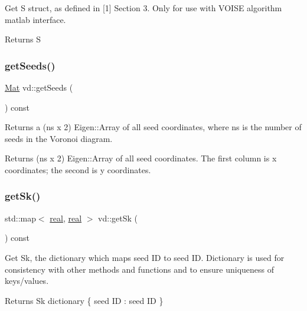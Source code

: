Get S struct, as defined in \mbox{[}1\mbox{]} Section 3. Only for use with V\+O\+I\+SE algorithm matlab interface. \begin{DoxyReturn}{Returns}
S 
\end{DoxyReturn}
\mbox{\label{classvd_a82f353c594c3c6b24f6077398f059d3a}} 
\subsubsection{\texorpdfstring{get\+Seeds()}{getSeeds()}}
{\footnotesize\ttfamily \mbox{\hyperlink{typedefs_8cpp_a9fa28c1f74e909474857584f5c7b0088}{Mat}} vd\+::get\+Seeds (\begin{DoxyParamCaption}{ }\end{DoxyParamCaption}) const}

Returns a (ns x 2) Eigen\+::\+Array of all seed coordinates, where ns is the number of seeds in the Voronoi diagram. \begin{DoxyReturn}{Returns}
(ns x 2) Eigen\+::\+Array of all seed coordinates. The first column is x coordinates; the second is y coordinates. 
\end{DoxyReturn}
\mbox{\label{classvd_a5c6dc6e749c955b5ee26139e19a02e0b}} 
\subsubsection{\texorpdfstring{get\+Sk()}{getSk()}}
{\footnotesize\ttfamily std\+::map$<$ \mbox{\hyperlink{typedefs_8cpp_a58a0c7cf2501f4492da833421be92547}{real}}, \mbox{\hyperlink{typedefs_8cpp_a58a0c7cf2501f4492da833421be92547}{real}} $>$ vd\+::get\+Sk (\begin{DoxyParamCaption}{ }\end{DoxyParamCaption}) const}

Get Sk, the dictionary which maps seed ID to seed ID. Dictionary is used for consistency with other methods and functions and to ensure uniqueness of keys/values. \begin{DoxyReturn}{Returns}
Sk dictionary \{ seed ID \+: seed ID \} 
\end{DoxyReturn}
\mbox{\label{classvd_a4d2c835e7804c4242dce6d411f01ce0a}} 
